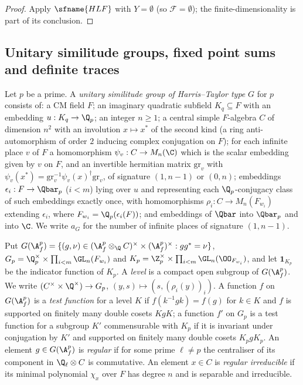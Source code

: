 \begin{proof}
Apply $\sfname{HLF}$ with $Y=\emptyset$ (so $\mathcal F=\emptyset$); the finite-dimensionality is part of its conclusion.
\end{proof}


\subsection{Unitary similitude groups, fixed point sums and definite traces}\label{pf:ks1:sec-groups}

\begin{definition}\label{pf:ks1:def-htgroup}
Let $p$ be a prime. A \emph{unitary similitude group of Harris--Taylor type} $G$ for $p$ consists of: a CM field $F$;
an imaginary quadratic subfield $K_q\subseteq F$ with an embedding $u:K_q\to\Q_p$; an integer $n\ge1$; a central
simple $F$-algebra $C$ of dimension $n^2$ with an involution $x\mapsto x^*$ of the second kind (a ring
anti-automorphism of order $2$ inducing complex conjugation on $F$); for each infinite place $v$ of $F$ a homomorphism
$\psi_v:C\to M_n(\C)$ which is the scalar embedding given by $v$ on $F$, and an invertible hermitian matrix
$\mathrm{gr}_v$ with $\psi_v(x^*)=\mathrm{gr}_v^{-1}\psi_v(x)^\dagger\mathrm{gr}_v$, of signature $(1,n-1)$ or $(0,n)$;
embeddings $\epsilon_i:F\to\Qbar_p$ ($i<m$) lying over $u$ and representing each $\Q_p$-conjugacy class of such
embeddings exactly once, with homomorphisms $\rho_i:C\to M_n(F_{w_i})$ extending $\epsilon_i$, where
$F_{w_i}=\Q_p(\epsilon_i(F))$; and embeddings of $\Qbar$ into $\Qbar_p$ and into $\C$. We write $a_G$ for the number of
infinite places of signature $(1,n-1)$.
\end{definition}

Put $G(\ksoneAfp)=\{(g,\nu)\in(\ksoneAfp\otimes_\Q C)^\times\times(\ksoneAfp)^\times: gg^*=\nu\}$,
$G_p=\Q_p^\times\times\prod_{i<m}\GL_n(F_{w_i})$ and $K_p=\Z_p^\times\times\prod_{i<m}\GL_n(\OO_{F_{w_i}})$, and let
$\mathbf 1_{K_p}$ be the indicator function of $K_p$. A \emph{level} is a compact open subgroup of $G(\ksoneAfp)$. We
write $(C^\times\times\Q^\times)\to G_p$, $(y,s)\mapsto(s,(\rho_i(y))_i)$. A function $f$ on $G(\ksoneAfp)$ is a \emph{test
function} for a level $K$ if $f(k^{-1}gk)=f(g)$ for $k\in K$ and $f$ is supported on finitely many double cosets $KgK$;
a function $f'$ on $G_p$ is a test function for a subgroup $K'$ commensurable with $K_p$ if it is invariant under
conjugation by $K'$ and supported on finitely many double cosets $K_pgK_p$. An element $g\in G(\ksoneAfp)$ is
\emph{regular} if for some prime $\ell\neq p$ the centraliser of its component in $\Q_\ell\otimes C$ is commutative. An element
$x\in C$ is \emph{regular irreducible} if its minimal polynomial $\chi_x$ over $F$ has degree $n$ and is separable and
irreducible.

